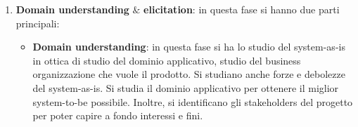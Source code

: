 \begin{enumerate}
      \item \textbf{Domain understanding} $\&$ \textbf{elicitation}: in questa
            fase si hanno due parti principali:
            \begin{itemize}
                  \item \textbf{Domain understanding}: in questa fase si ha lo
                        studio del system-as-is in ottica di studio del dominio
                        applicativo, studio del business organizzazione che vuole
                        il prodotto. Si studiano anche forze e debolezze del
                        system-as-is. Si studia il dominio applicativo per ottenere
                        il miglior system-to-be possibile. Inoltre, si
                        identificano gli stakeholders del progetto per poter
                        capire a fondo interessi e fini.


\end{itemize}
\end{enumerate}

